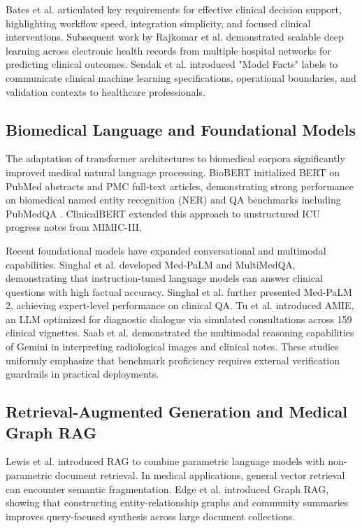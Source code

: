 \documentclass[journal,10pt,twocolumn]{IEEEtran}
\begin{document}
Bates et al. \cite{bates2003ten} articulated key requirements for effective clinical decision support, highlighting workflow speed, integration simplicity, and focused clinical interventions. Subsequent work by Rajkomar et al. \cite{rajkomar2018scalable} demonstrated scalable deep learning across electronic health records from multiple hospital networks for predicting clinical outcomes. Sendak et al. \cite{sendak2020real} introduced "Model Facts" labels to communicate clinical machine learning specifications, operational boundaries, and validation contexts to healthcare professionals.

\subsection{Biomedical Language and Foundational Models}
The adaptation of transformer architectures to biomedical corpora significantly improved medical natural language processing. BioBERT \cite{lee2020biobert} initialized BERT on PubMed abstracts and PMC full-text articles, demonstrating strong performance on biomedical named entity recognition (NER) and QA benchmarks including PubMedQA \cite{jin2019pubmedqa}. ClinicalBERT \cite{huang2020clinicalbert} extended this approach to unstructured ICU progress notes from MIMIC-III.

Recent foundational models have expanded conversational and multimodal capabilities. Singhal et al. \cite{singhal2023large} developed Med-PaLM and MultiMedQA, demonstrating that instruction-tuned language models can answer clinical questions with high factual accuracy. Singhal et al. \cite{singhal2023towards} further presented Med-PaLM 2, achieving expert-level performance on clinical QA. Tu et al. \cite{tu2024towards} introduced AMIE, an LLM optimized for diagnostic dialogue via simulated consultations across 159 clinical vignettes. Saab et al. \cite{saab2024capabilities} demonstrated the multimodal reasoning capabilities of Gemini in interpreting radiological images and clinical notes. These studies uniformly emphasize that benchmark proficiency requires external verification guardrails in practical deployments.

\subsection{Retrieval-Augmented Generation and Medical Graph RAG}
Lewis et al. \cite{lewis2020retrieval} introduced RAG to combine parametric language models with non-parametric document retrieval. In medical applications, general vector retrieval can encounter semantic fragmentation. Edge et al. \cite{edge2024from} introduced Graph RAG, showing that constructing entity-relationship graphs and community summaries improves query-focused synthesis across large document collections.
\end{document}
